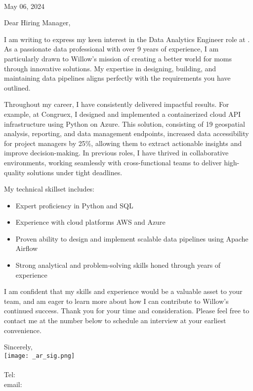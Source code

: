 \documentclass[letterpaper]{article}
\begin{document}
\large
\textbf{\JobCompany} \\

\null\hfill May 06, 2024

Dear Hiring Manager,

I am writing to express my keen interest in the Data Analytics Engineer role at
\JobCompany.
As a passionate data professional with over 9 years of
experience, I am particularly drawn to Willow's mission of creating a better
world for moms through innovative solutions.
My expertise in designing,
building, and maintaining data pipelines aligns perfectly with the requirements
you have outlined.

Throughout my career, I have consistently delivered impactful results.
For example, at Congruex, I designed and implemented a containerized cloud API
infrastructure using Python on Azure.
This solution, consisting of 19 geospatial analysis, reporting, and data management endpoints, increased data
accessibility for project managers by 25\%, allowing them to extract actionable
insights and improve decision-making.
In previous roles, I have thrived in collaborative environments, working seamlessly with cross-functional teams to
deliver high-quality solutions under tight deadlines.

My technical skillset includes:

\vspace{-12pt}
\begin{itemize} \itemsep 0pt
\item Expert proficiency in Python and SQL
\item Experience with cloud platforms AWS and Azure
\item Proven ability to design and implement scalable data pipelines using Apache Airflow
\item Strong analytical and problem-solving skills honed through years of experience
\end{itemize}

I am confident that my skills and experience would be a valuable asset to your team, and
am eager to learn more about how I can contribute to Willow's continued success.
Thank you for your time and consideration.
Please feel free to contact me at the number below to schedule an interview at your earliest convenience.

Sincerely,\\
    \hspace{1em}
    \texttt{[image: \_ar\_sig.png]} \\
    \CVsigname \\
    \small
    Tel: \CVphone \\
    email: \CVemail
\end{document}
